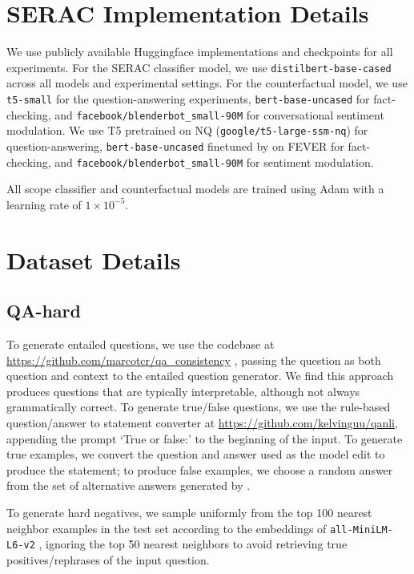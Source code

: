 \documentclass{article}
\begin{document}
\section{SERAC Implementation Details}
\label{sec:serac_impl}
We use publicly available Huggingface \cite{wolf2019hugging} implementations and checkpoints for all experiments. For the SERAC classifier model, we use \texttt{distilbert-base-cased} \cite{Sanh2019DistilBERTAD} across all models and experimental settings. For the counterfactual model, we use \texttt{t5-small} for the question-answering experiments, \texttt{bert-base-uncased} for fact-checking, and \texttt{facebook/blenderbot\_small-90M} \cite{roller2021recipes} for conversational sentiment modulation. We use T5 pretrained on NQ (\texttt{google/t5-large-ssm-nq}) for question-answering, \texttt{bert-base-uncased} finetuned by \citet{Cao2021EditingFK} on FEVER \cite{Thorne18Fever} for fact-checking, and \texttt{facebook/blenderbot\_small-90M} for sentiment modulation.

All scope classifier and counterfactual models are trained using Adam with a learning rate of $1\times 10^{-5}$. 


\section{Dataset Details}
\subsection{QA-hard}
To generate entailed questions, we use the codebase at \href{https://github.com/marcotcr/qa_consistency}{https://github.com/marcotcr/qa\_consistency} \citep{ribeiro2019red}, passing the question as both question and context to the entailed question generator. We find this approach produces questions that are typically interpretable, although not always grammatically correct. To generate true/false questions, we use the rule-based question/answer to statement converter at \href{https://github.com/kelvinguu/qanli}{https://github.com/kelvinguu/qanli}, appending the prompt `True or false:' to the beginning of the input. To generate true examples, we convert the question and answer used as the model edit to produce the statement; to produce false examples, we choose a random answer from the set of alternative answers generated by \citet{Cao2021EditingFK}.

To generate hard negatives, we sample uniformly from the top 100 nearest neighbor examples in the test set according to the embeddings of \texttt{all-MiniLM-L6-v2} \citep{reimers-2019-sentence-bert}, ignoring the top 50 nearest neighbors to avoid retrieving true positives/rephrases of the input question.
\end{document}
